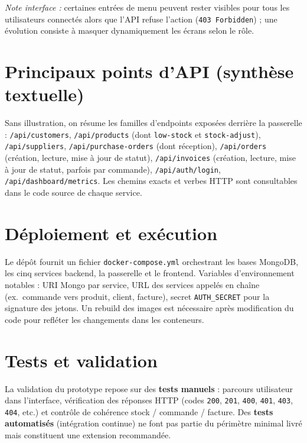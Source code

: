 \documentclass[11pt,a4paper]{article}
\begin{document}
\noindent\textit{Note interface :} certaines entrées de menu peuvent rester visibles pour tous les utilisateurs connectés alors que l'API refuse l'action (\texttt{403 Forbidden}) ; une évolution consiste à masquer dynamiquement les écrans selon le rôle.

\section{Principaux points d'API (synthèse textuelle)}
Sans illustration, on résume les familles d'endpoints exposées derrière la passerelle : \texttt{/api/customers}, \texttt{/api/products} (dont \texttt{low-stock} et \texttt{stock-adjust}), \texttt{/api/suppliers}, \texttt{/api/purchase-orders} (dont réception), \texttt{/api/orders} (création, lecture, mise à jour de statut), \texttt{/api/invoices} (création, lecture, mise à jour de statut, parfois par commande), \texttt{/api/auth/login}, \texttt{/api/dashboard/metrics}. Les chemins exacts et verbes HTTP sont consultables dans le code source de chaque service.

\section{Déploiement et exécution}
Le dépôt fournit un fichier \texttt{docker-compose.yml} orchestrant les bases MongoDB, les cinq services backend, la passerelle et le frontend. Variables d'environnement notables : URI Mongo par service, URL des services appelés en chaîne (ex.\ commande vers produit, client, facture), secret \texttt{AUTH\_SECRET} pour la signature des jetons. Un rebuild des images est nécessaire après modification du code pour refléter les changements dans les conteneurs.

\section{Tests et validation}
La validation du prototype repose sur des \textbf{tests manuels} : parcours utilisateur dans l'interface, vérification des réponses HTTP (codes \texttt{200}, \texttt{201}, \texttt{400}, \texttt{401}, \texttt{403}, \texttt{404}, etc.) et contrôle de cohérence stock / commande / facture. Des \textbf{tests automatisés} (intégration continue) ne font pas partie du périmètre minimal livré mais constituent une extension recommandée.
\end{document}
